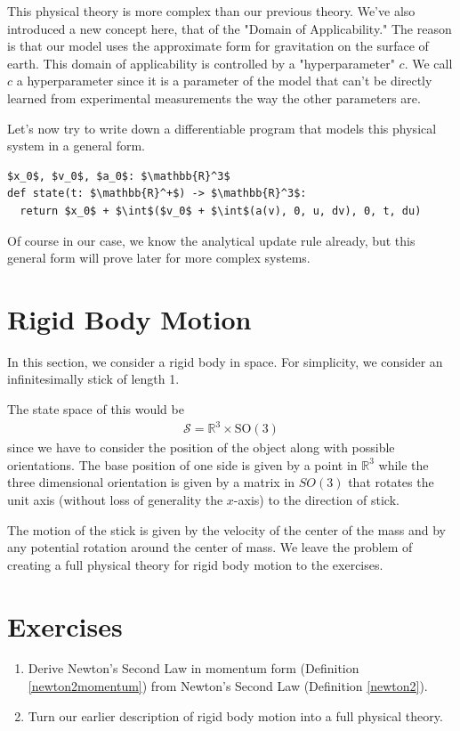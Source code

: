 \documentclass[book.tex]{subfiles}
\begin{document}
This physical theory is more complex than our previous theory. We've also introduced a new concept here, that of the "Domain of Applicability." The reason is that our model uses the approximate form for gravitation on the surface of earth. This domain of applicability is controlled by a "hyperparameter" $c$. We call $c$ a hyperparameter since it is a parameter of the model that can't be directly learned from experimental measurements the way the other parameters are. 

Let's now try to write down a differentiable program that models this physical system in a general form.

\begin{lstlisting}
$x_0$, $v_0$, $a_0$: $\mathbb{R}^3$
def state(t: $\mathbb{R}^+$) -> $\mathbb{R}^3$:
  return $x_0$ + $\int$($v_0$ + $\int$(a(v), 0, u, dv), 0, t, du)
\end{lstlisting}

Of course in our case, we know the analytical update rule already, but this general form will prove later for more complex systems.

\section{Rigid Body Motion}

In this section, we consider a rigid body in space. For simplicity, we consider an infinitesimally stick of length 1.

The state space of this would be \begin{align}
\mathcal{S} = \mathbb{R}^3 \times \textrm{SO}(3)
\end{align} 
since we have to consider the position of the object along with possible orientations. The base position of one side is given by a point in $\mathbb{R}^3$ while the three dimensional orientation is given by a matrix in $SO(3)$ that rotates the unit axis (without loss of generality the $x$-axis) to the direction of stick.

The motion of the stick is given by the velocity of the center of the mass and by any potential rotation around the center of mass. We leave the problem of creating a full physical theory for rigid body motion to the exercises.

\section{Exercises}
\begin{enumerate}
    \item Derive Newton's Second Law in momentum form (Definition \ref{newton2momentum}) from Newton's Second Law (Definition \ref{newton2}).
    \item Turn our earlier description of rigid body motion into a full physical theory.
\end{enumerate}
\end{document}
